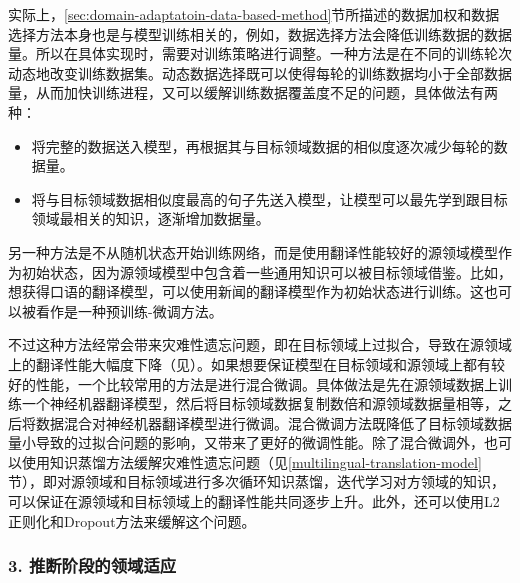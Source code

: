 \parinterval 实际上，\ref{sec:domain-adaptatoin-data-based-method}节所描述的数据加权和数据选择方法本身也是与模型训练相关的，例如，数据选择方法会降低训练数据的数据量。所以在具体实现时，需要对训练策略进行调整。一种方法是在不同的训练轮次动态地改变训练数据集。动态数据选择既可以使得每轮的训练数据均小于全部数据量，从而加快训练进程，又可以缓解训练数据覆盖度不足的问题，具体做法有两种：

\begin{itemize}
    \vspace{0.5em}
    \item 将完整的数据送入模型，再根据其与目标领域数据的相似度逐次减少每轮的数据量。
    \vspace{0.5em}
    \item 将与目标领域数据相似度最高的句子先送入模型，让模型可以最先学到跟目标领域最相关的知识，逐渐增加数据量。
    \vspace{0.5em}
\end{itemize}

\parinterval 另一种方法是不从随机状态开始训练网络，而是使用翻译性能较好的源领域模型作为初始状态，因为源领域模型中包含着一些通用知识可以被目标领域借鉴。比如，想获得口语的翻译模型，可以使用新闻的翻译模型作为初始状态进行训练。这也可以被看作是一种预训练-微调方法。

\parinterval 不过这种方法经常会带来灾难性遗忘问题，即在目标领域上过拟合，导致在源领域上的翻译性能大幅度下降（见{\chapterthirteen}）。如果想要保证模型在目标领域和源领域上都有较好的性能，一个比较常用的方法是进行混合微调。具体做法是先在源领域数据上训练一个神经机器翻译模型，然后将目标领域数据复制数倍和源领域数据量相等，之后将数据混合对神经机器翻译模型进行微调。混合微调方法既降低了目标领域数据量小导致的过拟合问题的影响，又带来了更好的微调性能。除了混合微调外，也可以使用知识蒸馏方法缓解灾难性遗忘问题（见\ref{multilingual-translation-model}节），即对源领域和目标领域进行多次循环知识蒸馏，迭代学习对方领域的知识，可以保证在源领域和目标领域上的翻译性能共同逐步上升。此外，还可以使用L2正则化和Dropout方法来缓解这个问题。

\subsubsection{3. 推断阶段的领域适应}

